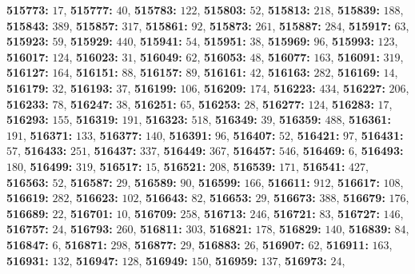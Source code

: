 \textsf{\bfseries 515773:} $17$, \textsf{\bfseries 515777:} $40$, \textsf{\bfseries 515783:} $122$, \textsf{\bfseries 515803:} $52$, \textsf{\bfseries 515813:} $218$, \textsf{\bfseries 515839:} $188$, \textsf{\bfseries 515843:} $389$, \textsf{\bfseries 515857:} $317$, \textsf{\bfseries 515861:} $92$, \textsf{\bfseries 515873:} $261$, \textsf{\bfseries 515887:} $284$, \textsf{\bfseries 515917:} $63$, \textsf{\bfseries 515923:} $59$, \textsf{\bfseries 515929:} $440$, \textsf{\bfseries 515941:} $54$, \textsf{\bfseries 515951:} $38$, \textsf{\bfseries 515969:} $96$, \textsf{\bfseries 515993:} $123$, \textsf{\bfseries 516017:} $124$, \textsf{\bfseries 516023:} $31$, \textsf{\bfseries 516049:} $62$, \textsf{\bfseries 516053:} $48$, \textsf{\bfseries 516077:} $163$, \textsf{\bfseries 516091:} $319$, \textsf{\bfseries 516127:} $164$, \textsf{\bfseries 516151:} $88$, \textsf{\bfseries 516157:} $89$, \textsf{\bfseries 516161:} $42$, \textsf{\bfseries 516163:} $282$, \textsf{\bfseries 516169:} $14$, \textsf{\bfseries 516179:} $32$, \textsf{\bfseries 516193:} $37$, \textsf{\bfseries 516199:} $106$, \textsf{\bfseries 516209:} $174$, \textsf{\bfseries 516223:} $434$, \textsf{\bfseries 516227:} $206$, \textsf{\bfseries 516233:} $78$, \textsf{\bfseries 516247:} $38$, \textsf{\bfseries 516251:} $65$, \textsf{\bfseries 516253:} $28$, \textsf{\bfseries 516277:} $124$, \textsf{\bfseries 516283:} $17$, \textsf{\bfseries 516293:} $155$, \textsf{\bfseries 516319:} $191$, \textsf{\bfseries 516323:} $518$, \textsf{\bfseries 516349:} $39$, \textsf{\bfseries 516359:} $488$, \textsf{\bfseries 516361:} $191$, \textsf{\bfseries 516371:} $133$, \textsf{\bfseries 516377:} $140$, \textsf{\bfseries 516391:} $96$, \textsf{\bfseries 516407:} $52$, \textsf{\bfseries 516421:} $97$, \textsf{\bfseries 516431:} $57$, \textsf{\bfseries 516433:} $251$, \textsf{\bfseries 516437:} $337$, \textsf{\bfseries 516449:} $367$, \textsf{\bfseries 516457:} $546$, \textsf{\bfseries 516469:} $6$, \textsf{\bfseries 516493:} $180$, \textsf{\bfseries 516499:} $319$, \textsf{\bfseries 516517:} $15$, \textsf{\bfseries 516521:} $208$, \textsf{\bfseries 516539:} $171$, \textsf{\bfseries 516541:} $427$, \textsf{\bfseries 516563:} $52$, \textsf{\bfseries 516587:} $29$, \textsf{\bfseries 516589:} $90$, \textsf{\bfseries 516599:} $166$, \textsf{\bfseries 516611:} $912$, \textsf{\bfseries 516617:} $108$, \textsf{\bfseries 516619:} $282$, \textsf{\bfseries 516623:} $102$, \textsf{\bfseries 516643:} $82$, \textsf{\bfseries 516653:} $29$, \textsf{\bfseries 516673:} $388$, \textsf{\bfseries 516679:} $176$, \textsf{\bfseries 516689:} $22$, \textsf{\bfseries 516701:} $10$, \textsf{\bfseries 516709:} $258$, \textsf{\bfseries 516713:} $246$, \textsf{\bfseries 516721:} $83$, \textsf{\bfseries 516727:} $146$, \textsf{\bfseries 516757:} $24$, \textsf{\bfseries 516793:} $260$, \textsf{\bfseries 516811:} $303$, \textsf{\bfseries 516821:} $178$, \textsf{\bfseries 516829:} $140$, \textsf{\bfseries 516839:} $84$, \textsf{\bfseries 516847:} $6$, \textsf{\bfseries 516871:} $298$, \textsf{\bfseries 516877:} $29$, \textsf{\bfseries 516883:} $26$, \textsf{\bfseries 516907:} $62$, \textsf{\bfseries 516911:} $163$, \textsf{\bfseries 516931:} $132$, \textsf{\bfseries 516947:} $128$, \textsf{\bfseries 516949:} $150$, \textsf{\bfseries 516959:} $137$, \textsf{\bfseries 516973:} $24$, 
